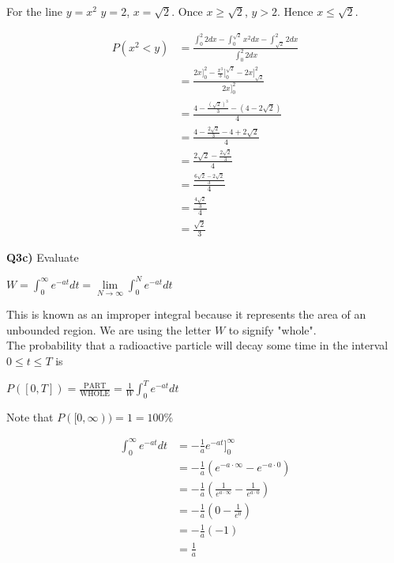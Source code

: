 \documentclass[9pt]{article}
\begin{document}
For the line $y = x^2$ $y = 2$, $x = \sqrt{2}$. Once $x \ge \sqrt{2}$, $y > 2$. Hence $x \leq \sqrt{2}$.

\begin{align*}
  P(x^2 < y) &= \frac{\int_0^2 2 dx - \int_0^{\sqrt{2}} x^2 dx - \int_{\sqrt{2}}^2 2 dx}{\int_0^2 2 dx} \\
  &= \frac{2x \bigg]_0^2 - \frac{x^3}{3} \bigg]_0^{\sqrt{2}} - 2x \bigg]_{\sqrt{2}}^2}{2x \bigg]_0^2} \\
  &= \frac{4 - \frac{(\sqrt{2})^3}{3} - (4 - 2\sqrt{2})}{4} \\
  &= \frac{4 - \frac{2\sqrt{2}}{3} - 4 + 2\sqrt{2}}{4} \\
  &= \frac{2\sqrt{2} - \frac{2\sqrt{2}}{3}}{4} \\
  &= \frac{\frac{6 \sqrt{2} - 2\sqrt{2}}{3}}{4} \\
  &= \frac{\frac{4 \sqrt{2}}{3}}{4} \\
  &= \frac{\sqrt{2}}{3}
\end{align*}


\begin{tcolorbox}
  \textbf{Q3c)} Evaluate \\
  \begin{center}
    $W = \int_0^{\infty} e^{-at} dt = \lim\limits_{N \rightarrow \infty} \int_0^N e^{-at} dt$
  \end{center}
  This is known as an improper integral because it represents the area of an unbounded region. We are using the letter $W$ to signify "whole". \\
  The probability that a radioactive particle will decay some time in the interval $0 \leq t \leq T$ is \\
  \begin{center}
    $P([0, T]) = \frac{\text{PART}}{\text{WHOLE}} = \frac{1}{W} \int_0^T e^{-at} dt$
  \end{center}
  \begin{center}
  \end{center}
  Note that $P([0, \infty)) = 1 = 100\%$
\end{tcolorbox}

\begin{align*}
  \int_0^{\infty} e^{-at} dt &= -\frac{1}{a} e^{-at} \bigg]_0^{\infty} \\
  &= -\frac{1}{a} (e^{-a \cdot \infty} - e^{-a \cdot 0}) \\
  &= -\frac{1}{a} (\frac{1}{e^{a \cdot \infty}} - \frac{1}{e^{a \cdot 0}}) \\
  &= -\frac{1}{a} (0 - \frac{1}{e^0}) \\
  &= -\frac{1}{a} (-1) \\
  &= \frac{1}{a}
\end{align*}
\end{document}
